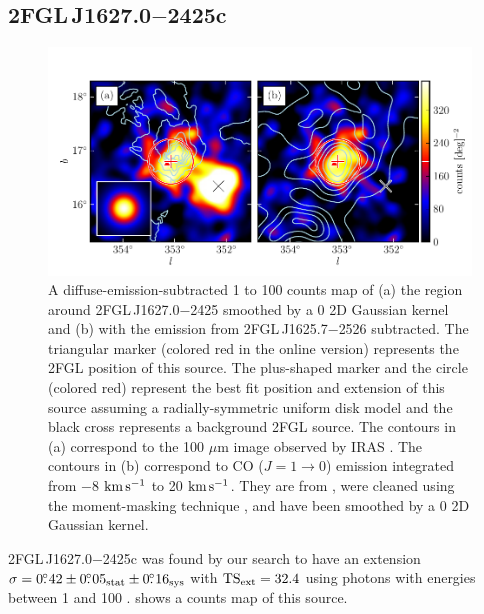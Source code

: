 \subsection{2FGL\,J1627.0$-$2425c}

\begin{figure}[htbp]
  \includegraphics{chapters/extended_search/figures/source_plots/source_Ophiuchus_color.pdf}
  \caption{A diffuse-emission-subtracted 1 \gev to 100 \gev counts map
  of (a) the region around 2FGL\,J1627.0$-$2425 smoothed by a 0 2D
  Gaussian kernel and (b) with the emission from 2FGL\,J1625.7$-$2526
  subtracted.  The triangular marker (colored red in the online version)
  represents the 2FGL position of this source.  The plus-shaped
  marker and the circle (colored red) represent the best fit position
  and extension of this source assuming a radially-symmetric uniform
  disk model and the black cross represents a background 2FGL source.
  The contours in (a) correspond to the 100 $\mu$m image observed by
  IRAS \citep{young_1986a_high-resolution-observations}.  The contours
  in (b) correspond to CO ($J=1\rightarrow 0$) emission integrated
  from $-$8 $\text{km}\,\text{s}^{-1}$ to 20 $\text{km}\,\text{s}^{-1}$.  They are
  from \cite{de-geus_1990a_survey-clouds}, were cleaned using the
  moment-masking technique \citep{dame_2011a_optimization-moment},
  and have been smoothed by a 0 2D Gaussian kernel.}
\end{figure}

2FGL\,J1627.0$-$2425c was found by our search to have an extension
$\sigma=0\mbox{$.\!\!^\circ$}42\pm0\mbox{$.\!\!^\circ$}05_\text{stat}\pm0\mbox{$.\!\!^\circ$}16_\text{sys}$ with $\mathrm{TS}_\mathrm{ext}=32.4$
using photons with energies between 1 \gev and 100 \gev.
 shows a counts map of this source.

